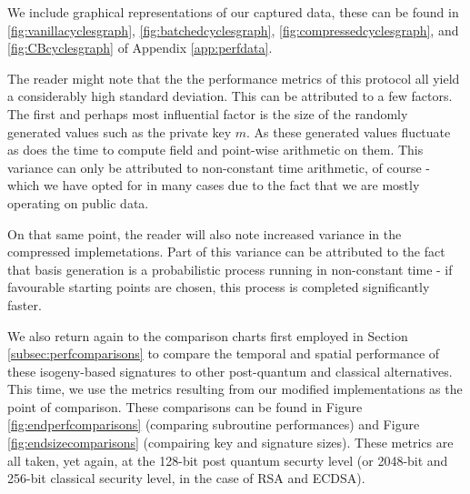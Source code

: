 We include graphical representations of our captured data, these can be found in \ref{fig:vanillacyclesgraph}, \ref{fig:batchedcyclesgraph}, \ref{fig:compressedcyclesgraph}, and \ref{fig:CBcyclesgraph} of Appendix \ref{app:perfdata}.

The reader might note that the the performance metrics of this protocol all yield a considerably high standard deviation. This can be attributed to a few factors. The first and perhaps most influential factor is the size of the randomly generated values such as the private key $m$. As these generated values fluctuate as does the time to compute field and point-wise arithmetic on them. This variance can only be attributed to non-constant time arithmetic, of course - which we have opted for in many cases due to the fact that we are mostly operating on public data.

On that same point, the reader will also note increased variance in the compressed implemetations. Part of this variance can be attributed to the fact that basis generation is a probabilistic process running in non-constant time - if favourable starting points are chosen, this process is completed significantly faster.

We also return again to the comparison charts first employed in Section \ref{subsec:perfcomparisons} to compare the temporal and spatial performance of these isogeny-based signatures to other post-quantum and classical alternatives. This time, we use the metrics resulting from our modified implementations as the point of comparison. These comparisons can be found in Figure \ref{fig:endperfcomparisons} (comparing subroutine performances) and Figure \ref{fig:endsizecomparisons} (compairing key and signature sizes). These metrics are all taken, yet again, at the 128-bit post quantum securty level (or 2048-bit and 256-bit classical security level, in the case of RSA and ECDSA).

